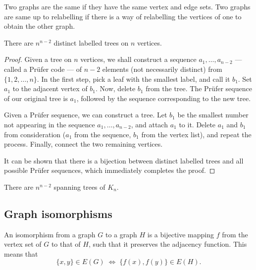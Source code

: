 \documentclass[11pt]{article}
\theoremstyle{definition}
\theoremstyle{remark}
\numberwithin{equation}{section}
\begin{document}
    \begin{definition}
        Two graphs are the same if they have the same vertex and edge sets. Two
        graphs are same up to relabelling if there is a way of relabelling the
        vertices of one to obtain the other graph.
    \end{definition}

    \begin{theorem}[Cayley]
        There are $n^{n - 2}$ distinct labelled trees on $n$ vertices.
    \end{theorem}
    \begin{proof}
        Given a tree on $n$ vertices, we shall construct a sequence $a_1, \dots, a_{n
        - 2}$ --- called a Pr\"ufer code --- of $n - 2$ elements (not necessarily
        distinct) from $\{1, 2, \dots, n\}$. In the first step, pick a leaf with the
        smallest label, and call it $b_1$. Set $a_1$ to the adjacent vertex of $b_1$.
        Now, delete $b_1$ from the tree. The Pr\"ufer sequence of our original
        tree is $a_1$, followed by the sequence corresponding to the new tree.
        
        Given a Pr\"ufer sequence, we can construct a tree. Let $b_1$ be the smallest
        number not appearing in the sequence $a_1, \dots, a_{n - 2}$, and attach
        $a_1$ to it. Delete $a_1$ and $b_1$ from consideration ($a_1$ from the
        sequence, $b_1$ from the vertex list), and repeat the process. Finally,
        connect the two remaining vertices.

        It can be shown that there is a bijection between distinct labelled trees and
        all possible Pr\"ufer sequences, which immediately completes the proof.
    \end{proof}

    \begin{corollary}
        There are $n^{n - 2}$ spanning trees of $K_n$.
    \end{corollary}


    \subsection{Graph isomorphisms}
    \begin{definition}
        An isomorphism from a graph $G$ to a graph $H$ is a bijective mapping $f$
        from the vertex set of $G$ to that of $H$, such that it preserves the
        adjacency function. This means that \[
            \{x, y\} \in E(G) \;\Longleftrightarrow\; \{f(x), f(y)\} \in E(H).
        \] 
    \end{definition}
\end{document}
